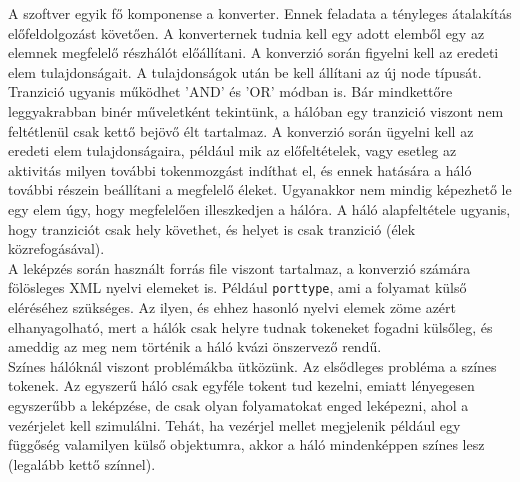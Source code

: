 
A szoftver egyik fő komponense a konverter. Ennek feladata a tényleges átalakítás előfeldolgozást követően.  A konverternek tudnia kell egy adott elemből egy az elemnek megfelelő részhálót előállítani. A konverzió során figyelni kell az eredeti elem tulajdonságait. A tulajdonságok után be kell állítani az új node típusát. Tranzició ugyanis működhet 'AND' és 'OR' módban is. Bár mindkettőre leggyakrabban binér műveletként tekintünk, a hálóban egy tranzició viszont nem feltétlenül csak kettő bejövő élt tartalmaz. A konverzió során ügyelni kell az eredeti elem tulajdonságaira, például mik az előfeltételek, vagy esetleg az aktivitás milyen további tokenmozgást indíthat el, és ennek hatására a háló további részein beállítani a megfelelő éleket. Ugyanakkor nem mindig képezhető le egy elem úgy, hogy megfelelően illeszkedjen a hálóra. A háló alapfeltétele ugyanis, hogy tranziciót csak hely követhet, és helyet is csak tranzició (élek közrefogásával).\\
A leképzés során használt forrás file viszont tartalmaz, a konverzió számára fölösleges XML nyelvi elemeket is. Például \texttt{porttype}, ami a folyamat külső eléréséhez szükséges. Az ilyen, és ehhez hasonló nyelvi elemek zöme azért elhanyagolható, mert a hálók csak helyre tudnak tokeneket fogadni külsőleg, és ameddig az meg nem történik a háló kvázi önszervező rendű.\\
Színes hálóknál viszont problémákba ütközünk. Az elsődleges probléma a színes tokenek. Az egyszerű háló csak egyféle tokent tud kezelni, emiatt lényegesen egyszerűbb a leképzése, de csak olyan folyamatokat enged leképezni, ahol a vezérjelet kell szimulálni. Tehát, ha vezérjel mellet megjelenik például egy függőség valamilyen külső objektumra, akkor a háló mindenképpen színes lesz (legalább kettő színnel). \\

